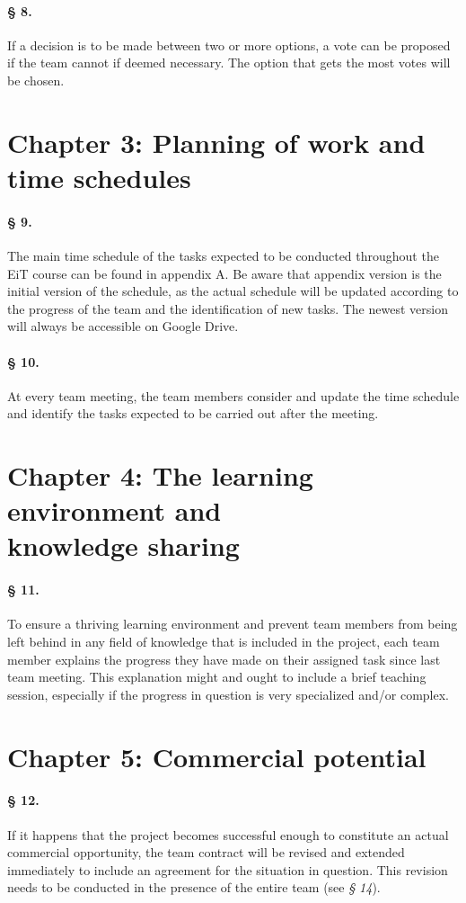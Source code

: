 \documentclass{article}
\begin{document}
\paragraph{§ 8.}
If a decision is to be made between two or more options, a vote can be proposed if the team cannot if deemed necessary. The 
option that gets the most votes will be chosen.
\section*{Chapter 3: Planning of work and time schedules}
\paragraph{§ 9.}
The main time schedule of the tasks expected to be conducted throughout the EiT course can be found in appendix A. Be aware that appendix version is the initial version of the schedule, as the actual schedule will be updated according to the progress of the team and the identification of new tasks. The newest version will always be accessible on Google Drive.
\paragraph{§ 10.}
At every team meeting, the team members consider and update the time schedule and identify the tasks expected to be carried out after the meeting.

\section*{Chapter 4: The learning environment and \\ knowledge sharing}
\paragraph{§ 11.}
To ensure a thriving learning environment and prevent team members from being left behind in any field of knowledge that is included in the project, each team member explains the progress they have made on their assigned task since last team meeting. This explanation might and ought to include a brief teaching session, especially if the progress in question is very specialized and/or complex.

\section*{Chapter 5: Commercial potential} \label{Com}
\paragraph{§ 12.}
If it happens that the project becomes successful enough to constitute an actual commercial opportunity, the team contract will be revised and extended immediately to include an agreement for the situation in question. This revision needs to be conducted in the presence of the entire team (see \textit{§ 14}).
\end{document}
